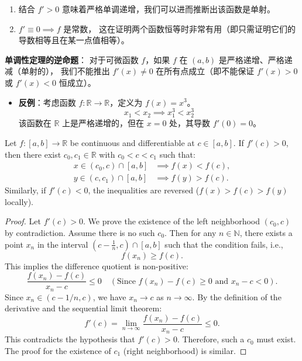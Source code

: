 \documentclass[
	UTF-8,
	11pt, %
	a4paper, %
]{LegrandOrangeBook}
\begin{document}
    \begin{remark}
    \begin{enumerate}
        \item 结合 $f' > 0$ 意味着严格单调递增，我们可以进而推断出该函数是单射。
        \item $f' \equiv 0 \implies f$ 是常数，
        这在证明两个函数恒等时非常有用（即只需证明它们的导数相等且在某一点值相等）。
    \end{enumerate}
    \end{remark}

    \newpage
    
    \begin{remark}
    \textbf{单调性定理的逆命题}：
        对于可微函数 $f$，如果 $f$ 在 $(a,b)$ 是严格递增、严格递减（单射的），
        我们不能推出 $f'(x) \neq 0$ 在所有点成立（即不能保证 $f'(x) > 0$ 或 $f'(x) < 0$ 恒成立）。
        \begin{itemize}
            \item \textbf{反例}：考虑函数 $f: \mathbb{R} \to \mathbb{R}$，定义为 $f(x) = x^3$。
            \[ x_1 < x_2 \implies x_1^3 < x_2^3 \]
            该函数在 $\mathbb{R}$ 上是严格递增的，但在 $x=0$ 处，其导数 $f'(0) = 0$。
        \end{itemize}
    \end{remark}

    \begin{theorem}
    Let $f: [a, b] \to \mathbb{R}$ be continuous and differentiable at $c \in [a, b]$. 
    If $f'(c) > 0$, then there exist $c_0, c_1 \in \mathbb{R}$ with $c_0 < c < c_1$ such that:
    \begin{align*}
        x \in (c_0, c) \cap [a, b] &\implies f(x) < f(c), \\
        y \in (c, c_1) \cap [a, b] &\implies f(y) > f(c).
    \end{align*}
    Similarly, if $f'(c) < 0$, the inequalities are reversed ($f(x) > f(c) > f(y)$ locally).
    \end{theorem}

    \begin{proof}
    Let $f'(c) > 0$. We prove the existence of the left neighborhood $(c_0, c)$ by contradiction.
    Assume there is no such $c_0$. Then for any $n \in \mathbb{N}$, there exists a point $x_n$ in the interval $(c - \frac{1}{n}, c) \cap [a, b]$ such that the condition fails, i.e.,
    \[ f(x_n) \ge f(c). \]
    This implies the difference quotient is non-positive:
    \[ \frac{f(x_n) - f(c)}{x_n - c} \le 0 \quad (\text{Since } f(x_n) - f(c) \ge 0 \text{ and } x_n - c < 0). \]
    Since $x_n \in (c - 1/n, c)$, we have $x_n \to c$ as $n \to \infty$. By the definition of the derivative and the sequential limit theorem:
    \[ f'(c) = \lim_{n \to \infty} \frac{f(x_n) - f(c)}{x_n - c} \le 0. \]
    This contradicts the hypothesis that $f'(c) > 0$. Therefore, such a $c_0$ must exist.
    The proof for the existence of $c_1$ (right neighborhood) is similar.
    \end{proof}
\end{document}
